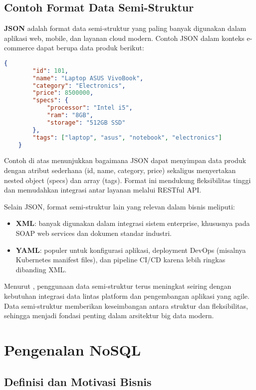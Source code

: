 \subsection{Contoh Format Data Semi-Struktur}

\textbf{JSON} adalah format data semi-struktur yang paling banyak digunakan dalam aplikasi web, mobile, dan layanan cloud modern. Contoh JSON dalam konteks e-commerce dapat berupa data produk berikut:

\begin{lstlisting}[language=json, caption={Contoh struktur data produk dalam format JSON}, label={lst:json_product}]
	{
		"id": 101,
		"name": "Laptop ASUS VivoBook",
		"category": "Electronics",
		"price": 8500000,
		"specs": {
			"processor": "Intel i5",
			"ram": "8GB",
			"storage": "512GB SSD"
		},
		"tags": ["laptop", "asus", "notebook", "electronics"]
	}
\end{lstlisting}

Contoh di atas menunjukkan bagaimana JSON dapat menyimpan data produk dengan atribut sederhana (id, name, category, price) sekaligus menyertakan nested object (specs) dan array (tags). Format ini mendukung fleksibilitas tinggi dan memudahkan integrasi antar layanan melalui RESTful API.

Selain JSON, format semi-struktur lain yang relevan dalam bisnis meliputi:
\begin{itemize}
	\item \textbf{XML}: banyak digunakan dalam integrasi sistem enterprise, khususnya pada SOAP web services dan dokumen standar industri.
	\item \textbf{YAML}: populer untuk konfigurasi aplikasi, deployment DevOps (misalnya Kubernetes manifest files), dan pipeline CI/CD karena lebih ringkas dibanding XML.
\end{itemize}

Menurut \cite{moniruzzaman2013nosql, gandomi2015}, penggunaan data semi-struktur terus meningkat seiring dengan kebutuhan integrasi data lintas platform dan pengembangan aplikasi yang agile. Data semi-struktur memberikan keseimbangan antara struktur dan fleksibilitas, sehingga menjadi fondasi penting dalam arsitektur big data modern.



\section{Pengenalan NoSQL}

\subsection{Definisi dan Motivasi Bisnis}

